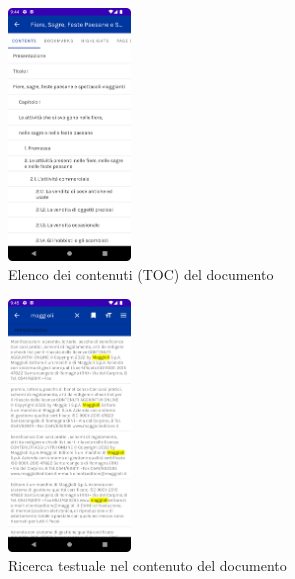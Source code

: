 \begin{multicols}{3}
            \begin{figure}[H]
                \centering
                \includegraphics[width=0.29\textwidth]{img/toc.png}
                \caption{Elenco dei contenuti (TOC) del documento}
                \label{toc-android}
            \end{figure}
            
            \begin{figure}[H]
                \centering
                \includegraphics[width=0.29\textwidth]{img/ricerca_testo.png}
                \caption{Ricerca testuale nel contenuto del documento}
                \label{ricerca_testo-android}
            \end{figure}
            

\end{multicols}
